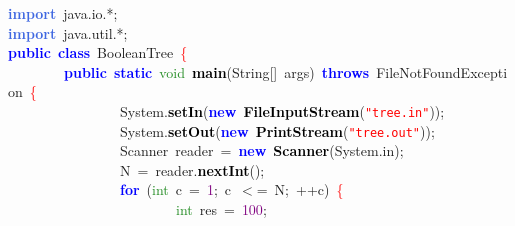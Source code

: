 
{\ttfamily \raggedright {
\noindent
\mbox{}\textbf{\textcolor{RoyalBlue}{import}}\ java\textcolor{BrickRed}{.}io\textcolor{BrickRed}{.*;} \\
\mbox{}\textbf{\textcolor{RoyalBlue}{import}}\ java\textcolor{BrickRed}{.}util\textcolor{BrickRed}{.*;} \\
\mbox{}\textbf{\textcolor{Blue}{public}}\ \textbf{\textcolor{Blue}{class}}\ BooleanTree\ \textcolor{Red}{\{} \\
\mbox{}\ \ \ \ \ \ \ \ \textbf{\textcolor{Blue}{public}}\ \textbf{\textcolor{Blue}{static}}\ \textcolor{ForestGreen}{void}\ \textbf{\textcolor{Black}{main}}\textcolor{BrickRed}{(}String\textcolor{BrickRed}{[]}\ args\textcolor{BrickRed}{)}\ \textbf{\textcolor{Blue}{throws}}\ FileNotFoundException\ \textcolor{Red}{\{} \\
\mbox{}\ \ \ \ \ \ \ \ \ \ \ \ \ \ \ \ System\textcolor{BrickRed}{.}\textbf{\textcolor{Black}{setIn}}\textcolor{BrickRed}{(}\textbf{\textcolor{Blue}{new}}\ \textbf{\textcolor{Black}{FileInputStream}}\textcolor{BrickRed}{(}\texttt{\textcolor{Red}{"{}tree.in"{}}}\textcolor{BrickRed}{));} \\
\mbox{}\ \ \ \ \ \ \ \ \ \ \ \ \ \ \ \ System\textcolor{BrickRed}{.}\textbf{\textcolor{Black}{setOut}}\textcolor{BrickRed}{(}\textbf{\textcolor{Blue}{new}}\ \textbf{\textcolor{Black}{PrintStream}}\textcolor{BrickRed}{(}\texttt{\textcolor{Red}{"{}tree.out"{}}}\textcolor{BrickRed}{));} \\
\mbox{}\ \ \ \ \ \ \ \ \ \ \ \ \ \ \ \ Scanner\ reader\ \textcolor{BrickRed}{=}\ \textbf{\textcolor{Blue}{new}}\ \textbf{\textcolor{Black}{Scanner}}\textcolor{BrickRed}{(}System\textcolor{BrickRed}{.}in\textcolor{BrickRed}{);} \\
\mbox{}\ \ \ \ \ \ \ \ \ \ \ \ \ \ \ \ N\ \textcolor{BrickRed}{=}\ reader\textcolor{BrickRed}{.}\textbf{\textcolor{Black}{nextInt}}\textcolor{BrickRed}{();} \\
\mbox{}\ \ \ \ \ \ \ \ \ \ \ \ \ \ \ \ \textbf{\textcolor{Blue}{for}}\ \textcolor{BrickRed}{(}\textcolor{ForestGreen}{int}\ c\ \textcolor{BrickRed}{=}\ \textcolor{Purple}{1}\textcolor{BrickRed}{;}\ c\ \textcolor{BrickRed}{$<$=}\ N\textcolor{BrickRed}{;}\ \textcolor{BrickRed}{++}c\textcolor{BrickRed}{)}\ \textcolor{Red}{\{} \\
\mbox{}\ \ \ \ \ \ \ \ \ \ \ \ \ \ \ \ \ \ \ \ \ \ \ \ \textcolor{ForestGreen}{int}\ res\ \textcolor{BrickRed}{=}\ \textcolor{Purple}{100}\textcolor{BrickRed}{;} \\
}}
